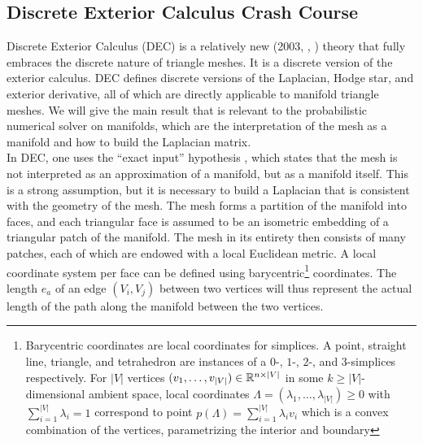\subsection*{Discrete Exterior Calculus Crash Course}
Discrete Exterior Calculus (DEC) is a relatively new (2003, \cite{discrete_exterior_calculus_thesis}, \cite{discrete_exterior_calculus}) theory that fully embraces the discrete nature of triangle meshes. It is a discrete version of the exterior calculus. DEC defines discrete versions of the Laplacian, Hodge star, and exterior derivative, all of which are directly applicable to manifold triangle meshes. We will give the main result that is relevant to the probabilistic numerical solver on manifolds, which are the interpretation of the mesh as a manifold and how to build the Laplacian matrix. 
\\
In DEC, one uses the “exact input” hypothesis \cite{sharp2021intrinsic}, which states that the mesh is not interpreted as an approximation of a manifold, but as a manifold itself. This is a strong assumption, but it is necessary to build a Laplacian that is consistent with the geometry of the mesh. The mesh forms a partition of the manifold into faces, and each triangular face is assumed to be an isometric embedding of a triangular patch of the manifold. The mesh in its entirety then consists of many patches, each of which are endowed with a local Euclidean metric. A local coordinate system per face can be defined using barycentric\footnote{Barycentric coordinates are local coordinates for simplices. A point, straight line, triangle, and tetrahedron are instances of a $0$-, $1$-, $2$-, and $3$-simplices respectively. For $|V|$ vertices $(v_1, \dots, v_{|V|})\in \mathbb{R}^{n \times |V|}$ in some $k \geq |V|$-dimensional ambient space, local coordinates $\Lambda = (\lambda_1, \dots, \lambda_{|V|}) \geq 0$ with $\sum_{i=1}^{|V|} \lambda_i = 1$ correspond to point $p(\Lambda) = \sum_{i=1}^{|V|} \lambda_i v_i$ which is a convex combination of the vertices, parametrizing the interior and boundary} coordinates.  The length $e_a$ of an edge $(V_i, V_j)$ between two vertices will thus represent the actual length of the path along the manifold between the two vertices.

